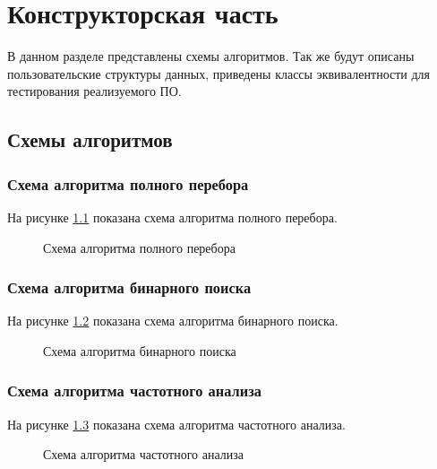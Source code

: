 
\chapter{Конструкторская часть}\label{Konstruct}

В данном разделе представлены схемы алгоритмов. Так же будут описаны пользовательские структуры данных, 
приведены классы эквивалентности для тестирования реализуемого ПО.

\section{Схемы алгоритмов}\label{SchemaAlg}


\subsection{Схема алгоритма полного перебора}\label{SchemaPoslMatrixMultiply}

На рисунке \ref{ris:schemaposav} показана схема алгоритма полного перебора.

\begin{figure}[H]
  \caption{Схема алгоритма полного перебора}
  \label{ris:schemaposav}
\end{figure}

\subsection{Схема алгоритма бинарного поиска}\label{SchemaParRowMatrixMultiply}

На рисунке \ref{ris:schemaparrowav} показана схема алгоритма бинарного поиска.

\begin{figure}[H]
  \caption{Схема алгоритма бинарного поиска}
  \label{ris:schemaparrowav}
\end{figure}

\subsection{Схема алгоритма частотного анализа}\label{SchemaParColumnMatrixMultiply}

На рисунке \ref{ris:schemaparcolumnav} показана схема алгоритма частотного анализа.

\begin{figure}[H]
  \caption{Схема алгоритма частотного анализа}
  \label{ris:schemaparcolumnav}
\end{figure}


